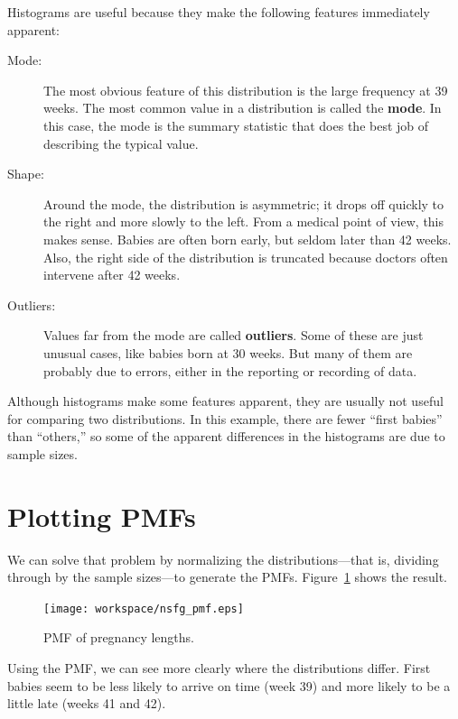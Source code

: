 \documentclass[12pt]{book}
\begin{document}
Histograms are useful because they make the following features immediately
apparent:

\begin{description}

\item[Mode:] The most obvious feature of this distribution is the
  large frequency at 39 weeks.  The most common value in a
  distribution is called the {\bf mode}.  In this case, the mode is
  the summary statistic that does the best job of describing the
  typical value.

\item[Shape:] Around the mode, the distribution is asymmetric; it
  drops off quickly to the right and more slowly to the left.  From a
  medical point of view, this makes sense.  Babies are often born
  early, but seldom later than 42 weeks.  Also, the right side of the
  distribution is truncated because doctors often intervene after 42
  weeks.

\item[Outliers:] Values far from the mode are called {\bf outliers}.
  Some of these are just unusual cases, like babies born at 30 weeks.
  But many of them are probably due to errors, either in the reporting
  or recording of data.

\end{description}

Although histograms make some features apparent, they are usually not
useful for comparing two distributions.  In this example, there are
fewer ``first babies'' than ``others,'' so some of the apparent
differences in the histograms are due to sample sizes.


\section{Plotting PMFs}

We can solve that problem by normalizing the distributions---that
is, dividing through by the sample sizes---to generate the PMFs.
Figure~\ref{nsfg_pmf} shows the result.

\begin{figure}
\centerline{\texttt{[image: workspace/nsfg\_pmf.eps]}}
\caption{PMF of pregnancy lengths.}
\label{nsfg_pmf}
\end{figure}

Using the PMF, we can see more clearly where the distributions
differ.  First babies seem to be less likely to arrive on time
(week 39) and more likely to be a little late (weeks 41 and 42).
\end{document}
